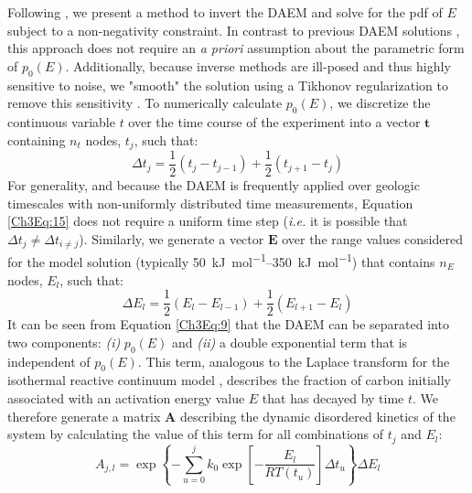 Following \citet{Forney:2012dr,Forney:2012hz}, we present a method to invert the DAEM and solve for the pdf of $E$ subject to a non-negativity constraint. In contrast to previous DAEM solutions \citep{Lakshmanan:1994vs,Cai:2007hh,deCaprariis:2012jk}, this approach does not require an \textit{a priori} assumption about the parametric form of $p_{0}(E)$. Additionally, because inverse methods are ill-posed and thus highly sensitive to noise, we "smooth" the solution using a Tikhonov regularization to remove this sensitivity \citep{Tikhonov:1977ui,Hansen:1994uc}. To numerically calculate $p_{0}(E)$, we discretize the continuous variable $t$ over the time course of the experiment into a vector $\mathbf{t}$ containing $n_{t}$ nodes, $t_{j}$, such that:
%
\begin{equation}\label{Ch3Eq:15}
	\Delta t_{j} = \frac{1}{2} \left(t_{j} - t_{j-1} \right) + \frac{1}{2} \left(t_{j+1} - t_{j} \right)
\end{equation}
%
For generality, and because the DAEM is frequently applied over geologic timescales with non-uniformly distributed time measurements, Equation \ref{Ch3Eq:15} does not require a uniform time step (\textit{i.e.} it is possible that $\Delta t_{j} \neq \Delta t_{i \neq j}$). Similarly, we generate a vector $\mathbf{E}$ over the range values considered for the model solution (typically \SIrange{50}{350}{kJ.mol^{-1}}) that contains $n_{E}$ nodes, $E_{l}$, such that:
%
\begin{equation}\label{Ch3Eq:16}
	\Delta E_{l} = \frac{1}{2} \left(E_{l} - E_{l-1} \right) + \frac{1}{2} \left(E_{l+1} - E_{l} \right)
\end{equation}
%
It can be seen from Equation \ref{Ch3Eq:9} that the DAEM can be separated into two components: \textit{(i)} $p_{0}(E)$ and \textit{(ii)} a double exponential term that is independent of $p_{0}(E)$. This term, analogous to the Laplace transform for the isothermal reactive continuum model \citep{Forney:2012hz}, describes the fraction of carbon initially associated with an activation energy value $E$ that has decayed by time $t$. We therefore generate a matrix $\mathbf{A}$ describing the dynamic disordered kinetics of the system by calculating the value of this term for all combinations of $t_{j}$ and $E_{l}$:
%
\begin{equation}\label{Ch3Eq:17}
	A_{j,l} = \exp \left\{ -\sum_{u=0}^{j} k_{0} \exp \left[ - \frac{E_{l}}{RT(t_{u})} \right] \Delta t_{u} \right\} \Delta E_{l}
\end{equation}
